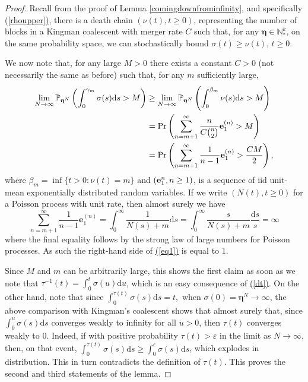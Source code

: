 \documentclass[10pt,a4paper]{amsart}
\newcommand{\dd}{{\mathrm d}}
\renewcommand{\eqref}[1]{\hyperref[#1]{(\ref*{#1})}}
\begin{document}
\begin{proof}
Recall from the proof of Lemma \ref{comingdownfrominfinity}, and specifically \eqref{rhoupper},  there is a death chain $(\nu(t), t\geq0)$, representing the number of blocks in a Kingman coalescent with merger rate $C$  such that, for any $\bm \eta\in\mathbb{N}^k_*$, on the same probability space, we can stochastically bound $\sigma(t)\geq \nu(t)$, $t\geq0$.


\medskip


We now note that, for any large $M>0$ there exists a constant $C>0$ (not necessarily the same as before) such that, for any $m$ sufficiently large,
\begin{align}
\lim_{N\to\infty}\mathbb{P}_{{\bm \eta}^N}\left(\int_0^{\gamma_m} \sigma(s)\dd s> M\right) 
&\geq \lim_{N\to\infty}\mathbb{P}_{{\bm \eta}^N}\left(\int_0^{\beta_m} \nu(s)\dd s> M\right) \notag\\
&= \Pr\left(\sum_{n = m+1}^\infty \frac{n}{C{n\choose 2}}\mathbf{e}^{(n)}_{1} >M\right)\notag\\
&=\Pr\left(\sum_{n = m+1}^\infty \frac{1}{n-1}\mathbf{e}^{(n)}_{1} >\frac{CM}{2}\right),
\label{eq1}
\end{align}
where $\beta_m = \inf\{t>0: \nu(t) = m\}$ and $({\bf e}^{n}_1, n\geq 1)$, is a sequence of iid unit-mean exponentially distributed random variables.
If we write $(N(t), t\geq 0)$ for a Poisson process with unit rate, then almost surely we have
\[
\sum_{n = m+1}^\infty \frac{1}{n-1}\mathbf{e}^{(n)}_{1} = \int_0^\infty \frac{1}{N(s)+m}\dd s 
=\int_0^\infty \frac{s}{N(s)+m}\frac{\dd s}{s} =\infty
\]
where  the final equality follows by the strong law of large numbers for Poisson processes. As such the right-hand side of \eqref{eq1} is equal to 1.

\medskip


Since $M$ and $m$ can be arbitrarily large, this shows the first claim as soon as we note that $\tau^{-1}(t) = \int_0^t \sigma(u)\dd u$, which  is an easy consequence of  \eqref{dt}. On the other hand, note that since 
$
\int_0^{\tau(t)} \sigma(s)\dd s = t,
$
when $\sigma(0)= {\bm \eta}^N \rightarrow\infty$, the above comparison with Kingman's coalescent shows that  almost surely that, since $\int_0^u\sigma(s)\dd s $ converges weakly to infinity for all $u>0$, then $\tau(t)$ converges weakly to 0. Indeed, if with positive probability $\tau(t)>\varepsilon$ in the limit as $N\to\infty$, then, on that event, 
$\int_0^{\tau(t)} \sigma(s)\dd s\geq \int_0^{\varepsilon} \sigma(s)\dd s$, which explodes in distribution. This in turn contradicts the definition of $\tau(t)$. This proves the second and third statements of the lemma.
\end{proof}
\end{document}
